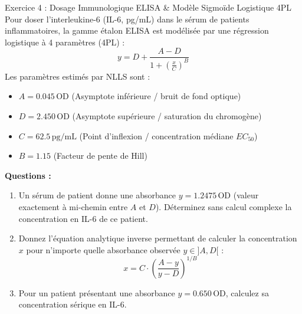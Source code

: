 \documentclass[11pt,a4paper]{article}
\begin{document}
\begin{exercicebox}{Exercice 4 : Dosage Immunologique ELISA \& Modèle Sigmoïde Logistique 4PL}
Pour doser l'interleukine-6 (IL-6, pg/mL) dans le sérum de patients inflammatoires, la gamme étalon ELISA est modélisée par une régression logistique à 4 paramètres (4PL) :
\begin{equation*}
  y = D + \frac{A - D}{1 + \left(\frac{x}{C}\right)^B}
\end{equation*}
Les paramètres estimés par NLLS sont :
\begin{itemize}
  \item $A = 0.045\,\text{OD}$ (Asymptote inférieure / bruit de fond optique)
  \item $D = 2.450\,\text{OD}$ (Asymptote supérieure / saturation du chromogène)
  \item $C = 62.5\,\text{pg/mL}$ (Point d'inflexion / concentration médiane $EC_{50}$)
  \item $B = 1.15$ (Facteur de pente de Hill)
\end{itemize}

\textbf{Questions :}
\begin{enumerate}[label=\textbf{\alph*.}]
  \item Un sérum de patient donne une absorbance $y = 1.2475\,\text{OD}$ (valeur exactement à mi-chemin entre $A$ et $D$). Déterminez sans calcul complexe la concentration en IL-6 de ce patient.
  \item Donnez l'équation analytique inverse permettant de calculer la concentration $x$ pour n'importe quelle absorbance observée $y \in ]A, D[$ :
  \begin{equation*}
    x = C \cdot \left(\frac{A - y}{y - D}\right)^{1/B}
  \end{equation*}
  \item Pour un patient présentant une absorbance $y = 0.650\,\text{OD}$, calculez sa concentration sérique en IL-6.
\end{enumerate}
\end{exercicebox}
\end{document}

